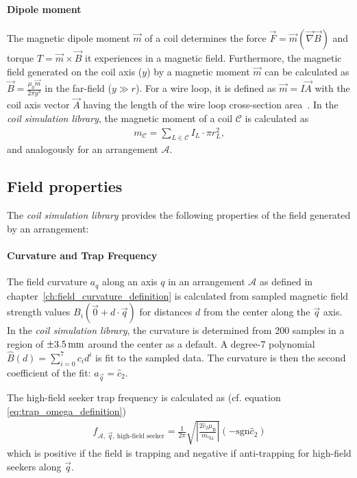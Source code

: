\paragraph{Dipole moment}
The magnetic dipole moment $\vec m$ of a coil determines the force $\vec F = \vec m (\vec \nabla \vec B)$ and torque $T = \vec m \times \vec B$ it experiences in a magnetic field. Furthermore, the magnetic field generated on the coil axis ($y$) by a magnetic moment $\vec m$ can be calculated as $\vec B = \frac{\mu_0 \vec m}{2\pi y^3}$ in the far-field ($y \gg r$). For a wire loop, it is defined as $\vec m = I \vec A$ with the coil axis vector $\vec A$ having the length of the wire loop cross-section area~\cite{demtroder_statische_2013}. In the \textit{coil simulation library}, the magnetic moment of a coil $\mathcal{C}$ is calculated as
\begin{align}\label{eq:dipole_moment_simulation}
    m_\mathcal{C} = \sum\limits_{L \in \mathcal{C}} I_L \cdot \pi r_L^2,
\end{align}
and analogously for an arrangement $\mathcal{A}$.

\subsection*{Field properties}
The \textit{coil simulation library} provides the following properties of the field generated by an arrangement:

\paragraph{Curvature and Trap Frequency}
The field curvature $a_q$ along an axis $q$ in an arrangement $\mathcal{A}$ as defined in chapter~\ref{ch:field_curvature_definition} is calculated from sampled magnetic field strength values $B_i(\vec 0 + d \cdot \vec q)$ for distances $d$ from the center along the $\vec q$ axis. In the \textit{coil simulation library}, the curvature is determined from \SI{200}{} samples in a region of $\SI{+-3.5}{\milli\meter}$ around the center as a default. A degree-7 polynomial ${\hat B(d) = \sum_{i=0}^7 c_i d^i}$ is fit to the sampled data. The curvature is then the second coefficient of the fit: $a_{\vec q} = \hat c_2$.

The high-field seeker trap frequency is calculated as (cf. equation \ref{eq:trap_omega_definition})
\begin{align}\label{eq:trap_frequency_simulation}
    f_{\mathcal{A},~\vec q,~\text{high-field seeker}} = \frac{1}{2\pi}  \sqrt{\left| \frac{2 \hat c_2 \mu_\text{B}}{m_{^6\text{Li}}} \right|} (-\mathrm{sgn} \hat c_2)
\end{align}
which is positive if the field is trapping and negative if anti-trapping for high-field seekers along $\vec q$.

